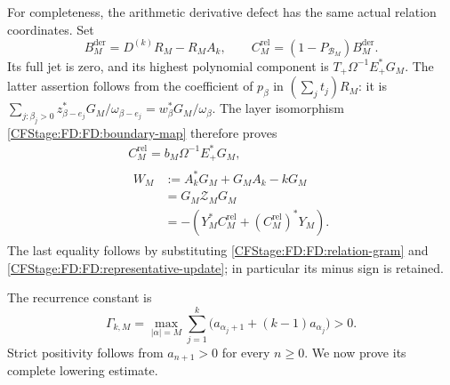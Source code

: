 For completeness, the arithmetic derivative defect has the same actual
relation coordinates.  Set
\[
B_M^{\mathrm{der}}=D^{(k)}R_M-R_MA_k,
\qquad C_M^{\mathrm{rel}}=(1-P_{\mathcal B_M})B_M^{\mathrm{der}}.
\]
Its full jet is zero, and its highest polynomial component is
\(T_+\Omega^{-1}E_+^*G_M\).  The latter assertion follows from the
coefficient of \(p_\beta\) in \((\sum_jt_j)R_M\): it is
\(\sum_{j:\beta_j>0}z_{\beta-e_j}^*G_M/\omega_{\beta-e_j}
=w_\beta^*G_M/\omega_\beta\).  The layer isomorphism
\eqref{CFStage:FD:FD:boundary-map} therefore proves
\begin{equation}
\begin{gathered}
C_M^{\mathrm{rel}}=b_M\Omega^{-1}E_+^*G_M,\\
\begin{aligned}
W_M&:=A_k^*G_M+G_MA_k-kG_M\\
&=G_M\mathcal Z_MG_M\\
&=-(Y_M^*C_M^{\mathrm{rel}}+(C_M^{\mathrm{rel}})^*Y_M).
\end{aligned}
\end{gathered}
\tag{FD.19}\label{CFStage:FD:FD:actual-control}
\end{equation}
The last equality follows by substituting
\eqref{CFStage:FD:FD:relation-gram} and \eqref{CFStage:FD:FD:representative-update}; in
particular its minus sign is retained.

The recurrence constant is
\begin{equation}
\Gamma_{k,M}=\max_{|\alpha|=M}\sum_{j=1}^k
\bigl(a_{\alpha_j+1}+(k-1)a_{\alpha_j}\bigr)>0.
\tag{FD.20}\label{CFStage:FD:FD:Gamma}
\end{equation}
Strict positivity follows from \(a_{n+1}>0\) for every \(n\ge0\).
We now prove its complete lowering estimate.

